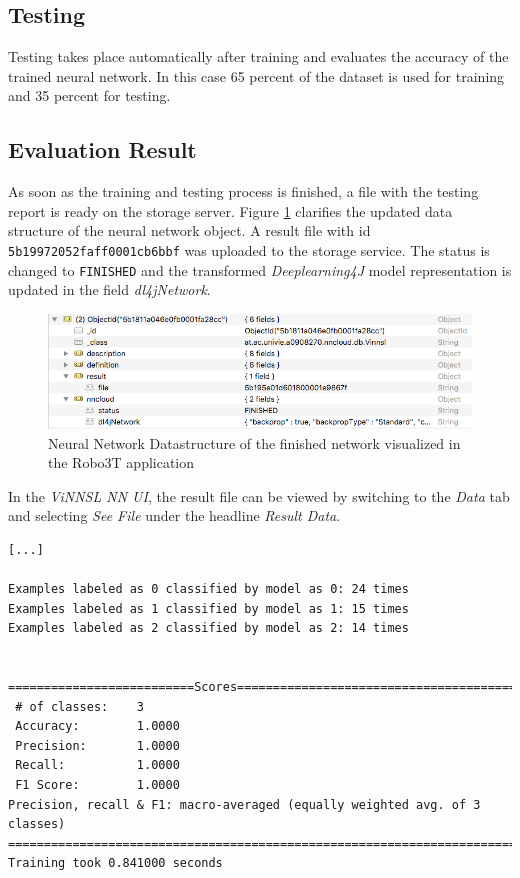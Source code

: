 \cite{dl4j-traininui}

\subsection{Testing}\label{testing}

Testing takes place automatically after training and evaluates the
accuracy of the trained neural network. In this case 65 percent of the
dataset is used for training and 35 percent for testing.

\subsection{Evaluation Result}\label{evaluation-result}

As soon as the training and testing process is finished, a file with the
testing report is ready on the storage server. Figure
\ref{usecase_1_datastructure_finished} clarifies the updated data
structure of the neural network object. A result file with id
\texttt{5b19972052faff0001cb6bbf} was uploaded to the storage service.
The status is changed to \texttt{FINISHED} and the transformed
\emph{Deeplearning4J} model representation is updated in the field
\emph{dl4jNetwork}.

\begin{figure}
\centering
\includegraphics[width=12.00000cm]{images/usecase_1_datastructure_finished}
\caption[Neural Network Datastructure of the finished network visualized
in the Robo3T application
\label{usecase_1_datastructure_finished}]{Neural Network Datastructure
of the finished network visualized in the Robo3T\footnotemark{}
application \label{usecase_1_datastructure_finished}}
\end{figure}

In the \emph{ViNNSL NN UI}, the result file can be viewed by switching
to the \emph{Data} tab and selecting \emph{See File} under the headline
\emph{Result Data}.

\begin{verbatim}
[...]

Examples labeled as 0 classified by model as 0: 24 times
Examples labeled as 1 classified by model as 1: 15 times
Examples labeled as 2 classified by model as 2: 14 times


==========================Scores========================================
 # of classes:    3
 Accuracy:        1.0000
 Precision:       1.0000
 Recall:          1.0000
 F1 Score:        1.0000
Precision, recall & F1: macro-averaged (equally weighted avg. of 3 classes)
========================================================================
Training took 0.841000 seconds
\end{verbatim}

